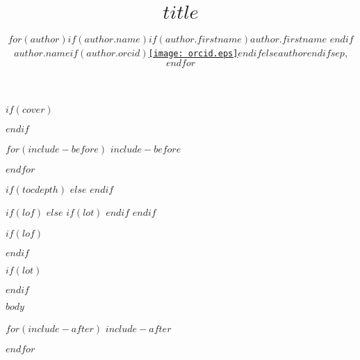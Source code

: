 \documentclass[twoside]{extreport}
\title{$title$}
\author{
$for(author)$$if(author.name)$$if(author.firstname)$$author.firstname$ $endif$$author.name$$if(author.orcid)$\href{https://orcid.org/$author.orcid$}{\texttt{[image: orcid.eps]}}$endif$$else$$author$$endif$$sep$, $endfor$
}
\begin{document}
$if(cover)$

$endif$
\maketitle
{}

$for(include-before)$
$include-before$

$endfor$


\clearpage

$if(tocdepth)$
\setcounter{tocdepth}{$tocdepth$}
$else$
\setcounter{tocdepth}{3}
$endif$
\tableofcontents
{}

$if(lof)$
\clearpage
$else$
  $if(lot)$
\clearpage
  $endif$
$endif$

$if(lof)$
\listoffigures
{}
\vspace{34pt}
$endif$

$if(lot)$
\listoftables
{}
$endif$

\clearpage


$body$

$for(include-after)$
$include-after$

$endfor$
\end{document}
